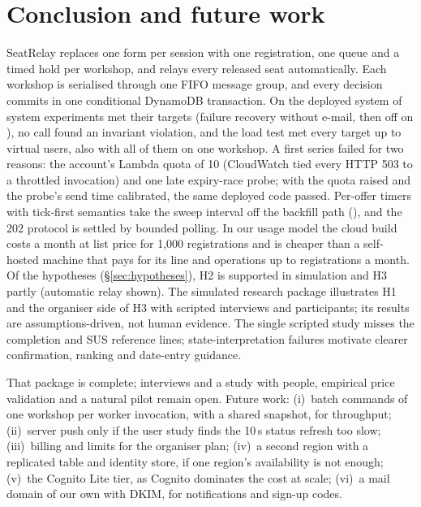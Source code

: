 \section{Conclusion and future work}\label{sec:conclusion}
SeatRelay replaces one form per session with one registration, one queue and a timed hold per
workshop, and relays every released seat automatically. Each workshop is serialised through one
FIFO message group, and every decision commits in one conditional DynamoDB transaction. On the
deployed system \SeriesPassed{} of \SeriesExperiments{} system experiments met their targets
(failure recovery without e-mail, then off on ), no  call found an
invariant violation, and the load test met every target up to \PerfDevMaxVUsMet{} virtual users,
also with all of them on one workshop. A first series failed for two reasons: the account's Lambda quota
of 10 (CloudWatch tied every HTTP 503 to a throttled invocation) and one late expiry-race probe; with the quota raised and the probe's send time calibrated, the same deployed code passed.
Per-offer timers with tick-first semantics take the
sweep interval off the backfill path (),
and the 202 protocol is settled by bounded polling. In our usage model the cloud build costs
\usd\CostTierOneKCloudListUsd{} a month at list price for 1{,}000 registrations and is cheaper than a
self-hosted machine that pays for its line and operations up to \CostCrossoverListFullRegs{}
registrations a month. Of the hypotheses (\S\ref{sec:hypotheses}), H2 is supported in simulation and H3 partly (automatic relay
shown). The simulated research package illustrates H1 and the organiser side of H3 with
\SimInterviewN{} scripted interviews and \SimStudyN{} participants; its results are assumptions-driven,
not human evidence. The single scripted study misses the completion and SUS reference lines;
state-interpretation failures motivate clearer confirmation, ranking and date-entry guidance.

That package is complete; interviews and a study with people, empirical price validation and a
natural pilot remain open. Future work: (i)~batch commands of one
workshop per worker invocation, with a shared snapshot, for throughput; (ii)~server push only if
the user study finds the 10\,s status refresh too slow; (iii)~billing and limits for the
organiser plan; (iv)~a second region with a replicated table and identity store, if one region's
availability is not enough; (v)~the Cognito Lite tier, as Cognito dominates the cost at scale; (vi)~a mail domain of our own
with DKIM, for notifications and sign-up codes.
